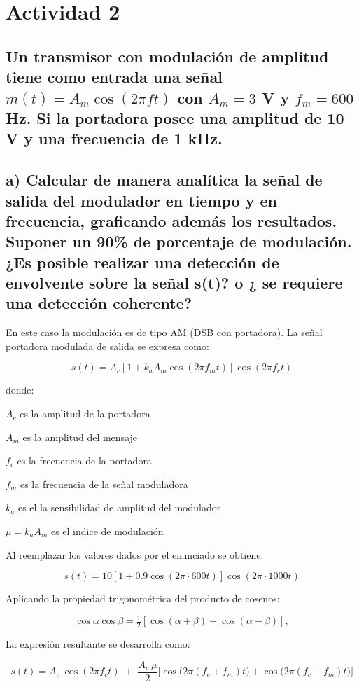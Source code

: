 \section{Actividad 2}

\subsection*{Un transmisor con modulación de amplitud tiene como entrada una señal $m(t)=A_m\cos(2\pi f t)$ con $A_m=3$ V y $f_m=600$ Hz. 
Si la portadora posee una amplitud de 10 V y una frecuencia de 1 kHz.}  

\subsection*{a)  Calcular de manera analítica la señal de salida del modulador en tiempo y en frecuencia, graficando además los resultados. Suponer un 90\% de porcentaje de modulación. ¿Es posible realizar una detección de envolvente sobre la señal s(t)? o ¿ se requiere una detección coherente?}

En este caso la modulación es de tipo AM (DSB con portadora). La señal portadora modulada de salida se expresa como:

    \[
        s(t) = A_c \left[ 1 + k_a A_m \cos(2\pi f_m t)\right]\cos(2\pi f_c t)
    \]

donde:  

\(A_c\) es la amplitud de la portadora 

\(A_m\) es la amplitud del mensaje

 \(f_c\) es la frecuencia de la portadora
 
 \(f_m\) es la frecuencia de la señal moduladora
 
 \(k_a\) es el la sensibilidad de amplitud del modulador

 \(\mu=k_a A_m\) es el indice de modulación

Al reemplazar los valores dados por el enunciado se obtiene:

    \[
        s(t) = 10\left[1+0.9\cos(2\pi \cdot 600t)\right]\cos(2\pi \cdot 1000t)
    \]
    

Aplicando la propiedad trigonométrica del producto de cosenos:

    \[
        \cos\alpha \cos\beta = \tfrac{1}{2}\left[\cos(\alpha+\beta)+\cos(\alpha-\beta)\right],
    \]

La expresión resultante se desarrolla como:

    \[
        s(t) = A_c\ \cos(2\pi f_c t) \;+\; \frac{A_c \ \mu}{2}\Big[ \cos\big(2\pi(f_c+f_m)t\big) + \cos\big(2\pi(f_c-f_m)t\big) \Big]
    \]


